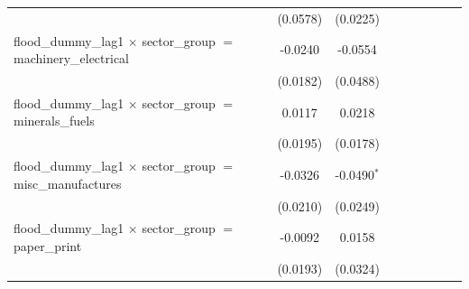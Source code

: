 \begin{tabular}{lcccccccc}
                                                                                  & (0.0578)              & (0.0225)              &                       &                       &                       &                       &                       &   \\   
   flood\_dummy\_lag1 $\times$ sector\_group $=$ machinery\_electrical            & -0.0240               & -0.0554               &                       &                       &                       &                       &                       &   \\   
                                                                                  & (0.0182)              & (0.0488)              &                       &                       &                       &                       &                       &   \\   
   flood\_dummy\_lag1 $\times$ sector\_group $=$ minerals\_fuels                  & 0.0117                & 0.0218                &                       &                       &                       &                       &                       &   \\   
                                                                                  & (0.0195)              & (0.0178)              &                       &                       &                       &                       &                       &   \\   
   flood\_dummy\_lag1 $\times$ sector\_group $=$ misc\_manufactures               & -0.0326               & -0.0490$^{*}$         &                       &                       &                       &                       &                       &   \\   
                                                                                  & (0.0210)              & (0.0249)              &                       &                       &                       &                       &                       &   \\   
   flood\_dummy\_lag1 $\times$ sector\_group $=$ paper\_print                     & -0.0092               & 0.0158                &                       &                       &                       &                       &                       &   \\   
                                                                                  & (0.0193)              & (0.0324)              &                       &                       &                       &                       &                       &   \\   

\end{tabular}
